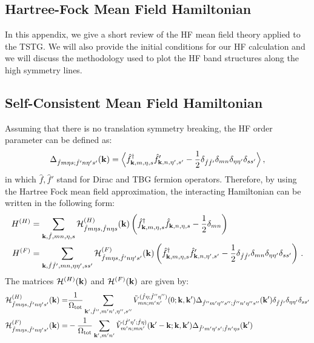 \documentclass[prb,aps,nofootinbib,amssymb,twocolumn,superscriptaddress,10pt]{revtex4-2}
\begin{document}
\begin{widetext}
\section{Hartree-Fock Mean Field Hamiltonian}\label{app_sec:hartreefock}
In this appendix, we give a short review of the HF mean field theory applied to the TSTG. We will also provide the initial conditions for our HF calculation and we will discuss the methodology used to plot the HF band structures along the high symmetry lines.
\subsection{Self-Consistent Mean Field Hamiltonian}
Assuming that there is no translation symmetry breaking, the HF order parameter can be defined as:
\begin{equation}
    \label{eq:ord_param_no_symbreak}
	\Delta_{\hat{f}m\eta s; \hat{f}'n\eta's'}(\mathbf{k}) = \Big{\langle} \hat{f}^\dagger_{\mathbf{k},m,\eta,s}\hat{f}'_{\mathbf{k},n,\eta',s'} - \frac12 \delta_{\hat{f}\hat{f}'}\delta_{mn}\delta_{\eta\eta'}\delta_{ss'} \Big{\rangle}\,,
\end{equation}
in which $\hat{f},\hat{f}'$ stand for Dirac and TBG fermion operators. Therefore, by using the Hartree Fock mean field approximation, the interacting Hamiltonian can be written in the following form:
\begin{align}
	H^{(H)} &= \sum_{\mathbf{k}, \hat{f}, mn, \eta, s}\mathcal{H}^{(H)}_{\hat{f}m\eta s,\hat{f}n\eta s}(\mathbf{k})\left(\hat{f}^\dagger_{\mathbf{k},m,\eta,s}\hat{f}_{\mathbf{k},n,\eta,s} - \frac{1}{2}\delta_{mn}\right)\\
	H^{(F)} &= \sum_{\mathbf{k},\hat{f}\hat{f}',mn,\eta\eta',ss'}\mathcal{H}^{(F)}_{\hat{f}m\eta s,\hat{f}'n\eta's'}(\mathbf{k})\left(\hat{f}^\dagger_{\mathbf{k},m,\eta,s}\hat{f}'_{\mathbf{k},n,\eta',s'} - \frac{1}{2}\delta_{\hat{f}\hat{f}'}\delta_{mn}\delta_{\eta\eta'}\delta_{ss'}\right)\,.
\end{align}
The matrices $\mathcal{H}^{(H)}(\mathbf{k})$ and $\mathcal{H}^{(F)}(\mathbf{k})$ are given by:
\begin{align}
	\mathcal{H}^{(H)}_{\hat{f}m\eta s,\hat{f}'n\eta's'}(\vk) =& \frac{1}{\Omega_{\rm tot}}\sum_{\vk', \hat{f}'',m'n',\eta'', s''}\tilde{V}^{(\hat{f}\eta;\hat{f}''\eta'')}_{mn;m'n'}(0; \vk,\vk') \Delta_{\hat{f}''m'\eta''s'';\hat{f}''n'\eta''s''}(\vk') \delta_{\hat{f}\hat{f}'} \delta_{\eta\eta'}\delta_{ss'} \label{eqn:Hartree_k} \\
	\mathcal{H}^{(F)}_{\hat{f}m\eta s,\hat{f}'n\eta's'}(\vk) =& -\frac{1}{\Omega_{\rm tot}}\sum_{\vk',m'n'}\tilde{V}^{(\hat{f}'\eta';\hat{f}\eta)}_{m'n;mn'}(\vk'-\vk;\vk,\vk') \Delta_{\hat{f}'m'\eta's'; \hat{f}n'\eta s}(\vk') \label{eqn:Fock_k}

\end{align}
\end{widetext}
\end{document}
